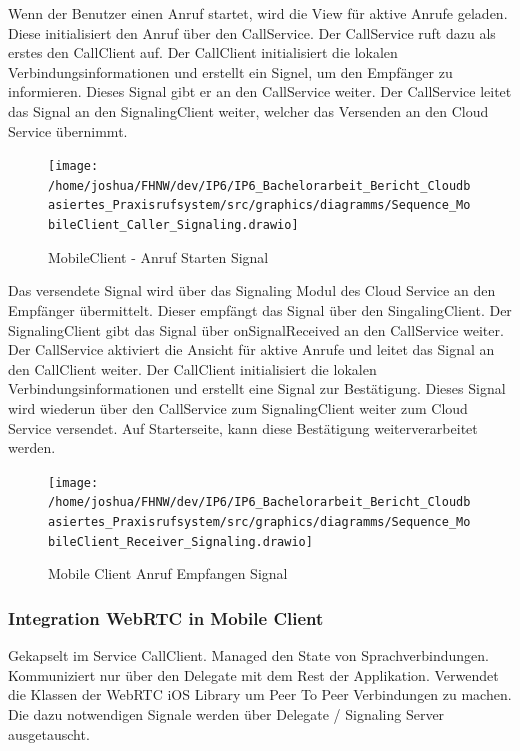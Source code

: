 Wenn der Benutzer einen Anruf startet, wird die View für aktive Anrufe geladen.
Diese initialisiert den Anruf über den CallService.
Der CallService ruft dazu als erstes den CallClient auf.
Der CallClient initialisiert die lokalen Verbindungsinformationen und erstellt ein Signel, um den Empfänger zu informieren.
Dieses Signal gibt er an den CallService weiter.
Der CallService leitet das Signal an den SignalingClient weiter, welcher das Versenden an den Cloud Service übernimmt.

\clearpage
\begin{figure}[h]
    \centering
    \begin{minipage}[b]{0.8\textwidth}
        \texttt{[image: /home/joshua/FHNW/dev/IP6/IP6\_Bachelorarbeit\_Bericht\_Cloudbasiertes\_Praxisrufsystem/src/graphics/diagramms/Sequence\_MobileClient\_Caller\_Signaling.drawio]}
        \caption{MobileClient - Anruf Starten Signal}
    \end{minipage}
\end{figure}

Das versendete Signal wird über das Signaling Modul des Cloud Service an den Empfänger übermittelt.
Dieser empfängt das Signal über den SingalingClient.
Der SignalingClient gibt das Signal über onSignalReceived an den CallService weiter.
Der CallService aktiviert die Ansicht für aktive Anrufe und leitet das Signal an den CallClient weiter.
Der CallClient initialisiert die lokalen Verbindungsinformationen und erstellt eine Signal zur Bestätigung.
Dieses Signal wird wiederun über den CallService zum SignalingClient weiter zum Cloud Service versendet.
Auf Starterseite, kann diese Bestätigung weiterverarbeitet werden.

\begin{figure}[h]
    \centering
    \begin{minipage}[b]{0.8\textwidth}
        \texttt{[image: /home/joshua/FHNW/dev/IP6/IP6\_Bachelorarbeit\_Bericht\_Cloudbasiertes\_Praxisrufsystem/src/graphics/diagramms/Sequence\_MobileClient\_Receiver\_Signaling.drawio]}
        \caption{Mobile Client Anruf Empfangen Signal}
    \end{minipage}
\end{figure}

\clearpage

\subsubsection{Integration WebRTC in Mobile Client}

Gekapselt im Service CallClient.
Managed den State von Sprachverbindungen.
Kommuniziert nur über den Delegate mit dem Rest der Applikation.
Verwendet die Klassen der WebRTC iOS Library um Peer To Peer Verbindungen zu machen.
Die dazu notwendigen Signale werden über Delegate / Signaling Server ausgetauscht.

